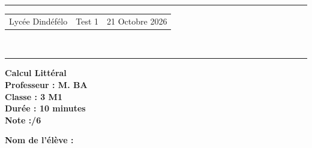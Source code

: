\documentclass[a4paper,12pt]{article}
\begin{document}
\hrule %
\begin{center}
    \begin{tabular}{@{} p{5cm} p{5cm} p{5cm} @{}} %
        Lycée Dindéfélo & \quad\quad\quad Test 1 & 21 Octobre 2026 \\
    \end{tabular}
    \\[-0.01cm] %
    \hrule %
\end{center}
\begin{center}
    \textbf{\Large Calcul Littéral } \\[0.2cm]
    \textbf{\large Professeur : M. BA} \\[0.2cm]
    \textbf{Classe : 3 M1} \\[0.2cm]
    \textbf{\small Durée : 10 minutes} \\[0.2cm]
    \textbf{\small Note :\quad\quad /6}
\end{center}

\textbf{\small Nom de l'élève :} \underline{\hspace{8cm}} \\[0.5cm]
\end{document}
